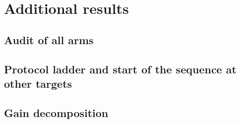 \section{Additional results}

\subsection{Audit of all arms}
\label{app:audit}
\begin{table}[h]
\centering
\caption{Certified coverage (\%) with abort rate (ab) and validity statistics for every arm, all items. exc is the
fraction of non-aborted splits whose test-fold risk exceeds $\alpha$; cv is the fraction whose one-sided $90\%$
Clopper--Pearson lower bound on test risk exceeds $\alpha$. The fixed $q{=}0.10$ gate was chosen with knowledge of
these benchmarks and is not certified.}
\label{tab:audit}
\tiny
\resizebox{\textwidth}{!}{}
\end{table}

\subsection{Protocol ladder and start of the sequence at other targets}
\label{app:ladder}
\begin{table}[h]
\centering
\caption{As Table~\ref{tab:ladder} at $\alpha=0.15$.}
\small
\resizebox{\textwidth}{!}{}
\end{table}
\begin{table}[h]
\centering
\caption{As Table~\ref{tab:start} at $\alpha=0.05$.}
\scriptsize
\resizebox{\textwidth}{!}{}
\end{table}
\begin{table}[h]
\centering
\caption{As Table~\ref{tab:start} at $\alpha=0.15$.}
\scriptsize
\resizebox{\textwidth}{!}{}
\end{table}

\subsection{Gain decomposition}
\begin{table}[t]
\centering
\caption{Gain decomposition (points of test coverage), $q=0.10$, all items, conditional on both arms certifying.}
\label{tab:dilution}
\small
\resizebox{\textwidth}{!}{}
\end{table}

